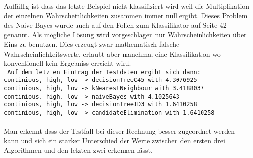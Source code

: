 \documentclass[a4paper]{article}
\begin{document}
\\
Auffällig ist dass das letzte Beispiel nicht klassifiziert wird weil die Multiplikation der einzelnen Wahrscheinlichkeiten zusammen immer null ergibt. Dieses Problem des Naive Bayes wurde auch auf den Folien zum Klassifikator auf Seite 42 genannt. Als mögliche Lösung wird vorgeschlagen nur Wahrscheinlichkeiten über Eins zu benutzen. Dies erzeugt zwar mathematisch falsche Wahrscheinlichkeitswerte, erlaubt aber manchmal eine Klassifikation wo konventionell kein Ergebniss erreicht wird.\\
\texttt{
Auf dem letzten Eintrag der Testdaten ergibt sich dann:\\
continious, high, low -> decisionTreeC45 with 4.3076925 \\
continious, high, low -> kNearestNeighbour with 3.4188037 \\
continious, high, low -> naiveBayes with 4.1025643 \\
continious, high, low -> decisionTreeID3 with 1.6410258 \\
continious, high, low -> candidateElimination with 1.6410258 \\
\\
}
Man erkennt dass der Testfall bei dieser Rechnung besser zugeordnet werden kann und sich ein starker Unterschied der Werte zwischen den ersten drei Algorithmen und den letzten zwei erkennen lässt.
\end{document}
